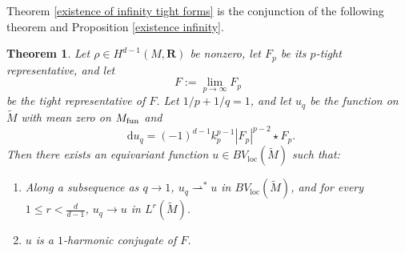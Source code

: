 \documentclass[reqno,11pt]{amsart}
\newcommand{\RR}{\mathbf{R}}
\newcommand*\dif{\mathop{}\!\mathrm{d}}
\newcommand{\weakto}{\rightharpoonup}
\newcommand{\loc}{\mathrm{loc}}
\newtheorem{theorem}{Theorem}[section]
\theoremstyle{definition}
\numberwithin{equation}{section}
\begin{document}
Theorem \ref{existence of infinity tight forms} is the conjunction of the following theorem and Proposition \ref{existence infinity}.

\begin{theorem}\label{existence 1}
Let $\rho \in H^{d - 1}(M, \RR)$ be nonzero, let $F_p$ be its $p$-tight representative, and let 
$$F := \lim_{p \to \infty} F_p$$
be the tight representative of $F$.
Let $1/p + 1/q = 1$, and let $u_q$ be the function on $\tilde M$ with mean zero on $M_{\rm fun}$ and
$$\dif u_q = (-1)^{d - 1} k_p^{p - 1} |F_p|^{p - 2} \star F_p.$$
Then there exists an equivariant function $u \in BV_\loc(\tilde M)$ such that:
\begin{enumerate}
\item Along a subsequence as $q \to 1$, $u_q \weakto^* u$ in $BV_\loc(\tilde M)$, and for every $1 \leq r < \frac{d}{d - 1}$, $u_q \to u$ in $L^r(\tilde M)$.
\item $u$ is a $1$-harmonic conjugate of $F$.
\end{enumerate}
\end{theorem}
\end{document}
